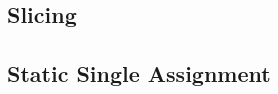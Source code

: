 
\subsection{Slicing}
\label{subsection:slicing}



\subsection{Static Single Assignment}
\label{subsection:static-single-assignment}



